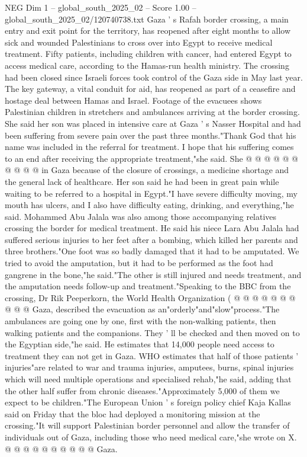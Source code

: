 \begin{textsample}{NEG Dim 1 – global\_south\_2025\_02 – Score 1.00 – global\_south\_2025\_02/120740738.txt}  \label{ex:f1_neg_087}
Gaza ' s Rafah border crossing, a main entry and exit point for the territory, has reopened after eight months to allow sick and wounded Palestinians to cross over into Egypt to receive medical treatment.
Fifty patients, including children with cancer, had entered Egypt to access medical care, according to the Hamas-run health ministry.
The crossing had been closed since Israeli forces took control of the Gaza side in May last year.
The key gateway, a vital conduit for aid, has reopened as part of a ceasefire and hostage deal between Hamas and Israel.
Footage of the evacuees shows Palestinian children in stretchers and ambulances arriving at the border crossing.
She said her son was placed in intensive care at Gaza ' s Nasser Hospital and had been suffering from severe pain over the past three months."Thank God that his name was included in the referral for treatment.
I hope that his suffering comes to an end after receiving the appropriate treatment,"she said.
She @ @ @ @ @ @ @ @ @ @ in Gaza because of the closure of crossings, a medicine shortage and the general lack of healthcare.
Her son said he had been in great pain while waiting to be referred to a hospital in Egypt."I have severe difficulty moving, my mouth has ulcers, and I also have difficulty eating, drinking, and everything,"he said.
Mohammed Abu Jalala was also among those accompanying relatives crossing the border for medical treatment.
He said his niece Lara Abu Jalala had suffered serious injuries to her feet after a bombing, which killed her parents and three brothers."One foot was so badly damaged that it had to be amputated.
We tried to avoid the amputation, but it had to be performed as the foot had gangrene in the bone,"he said."The other is still injured and needs treatment, and the amputation needs follow-up and treatment."Speaking to the BBC from the crossing, Dr Rik Peeperkorn, the World Health Organization ( @ @ @ @ @ @ @ @ @ @ Gaza, described the evacuation as an"orderly"and"slow"process."The ambulances are going one by one, first with the non-walking patients, then walking patients and the companions.
They ' ll be checked and then moved on to the Egyptian side,"he said.
He estimates that 14,000 people need access to treatment they can not get in Gaza.
WHO estimates that half of those patients ' injuries"are related to war and trauma injuries, amputees, burns, spinal injuries which will need multiple operations and specialised rehab,"he said, adding that the other half suffer from chronic diseases."Approximately 5,000 of them we expect to be children."The European Union ' s foreign policy chief Kaja Kallas said on Friday that the bloc had deployed a monitoring mission at the crossing."It will support Palestinian border personnel and allow the transfer of individuals out of Gaza, including those who need medical care,"she wrote on X. @ @ @ @ @ @ @ @ @ @ Gaza.

\end{textsample}
